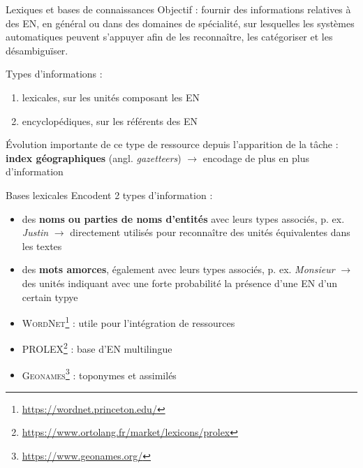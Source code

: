 \documentclass[xetex,xcolor={table,usenames,dvipsnames}]{beamer}
\newcommand{\bolder}[1]{{\color{purple}\bfseries#1}}
\begin{document}
\begin{frame}{Lexiques et bases de connaissances}
	Objectif : \textcolor{deepred}{fournir des informations relatives à des \textsc{EN}}, en général ou dans des domaines de spécialité, sur lesquelles les \textcolor{deepred}{systèmes automatiques peuvent s'appuyer} afin de les reconnaître, les catégoriser et les désambiguïser.
	
	Types d'informations : 
	\begin{enumerate}
		\item lexicales, sur les unités composant les \textsc{EN}
		\item encyclopédiques, sur les référents des \textsc{EN}
	\end{enumerate}
	
%	
		Évolution importante de ce type de ressource depuis l'apparition de la tâche :
	\bolder{index géographiques} (angl. \textit{gazetteers}) $\rightarrow$ encodage de plus en plus d'information
\end{frame}



\begin{frame}{Bases lexicales}
		Encodent 2 types d'information : 
	\begin{itemize}
		\item des \textcolor{deepblue}{\textbf{noms ou parties de noms d'entités}} avec leurs types associés, p. ex. \textit{Justin}
		$\rightarrow$ directement utilisés pour reconnaître des unités équivalentes dans les textes		
		\item des \textcolor{deepblue}{\textbf{mots amorces}}, également avec leurs types associés, p. ex. \textit{Monsieur}
		$\rightarrow$ des unités indiquant avec une forte probabilité la présence d'une \textsc{EN} d'un certain typye
	\end{itemize}
	\begin{itemize}
		\item \textsc{WordNet}\footnote{\url{https://wordnet.princeton.edu/}} : utile pour l'intégration de ressources
		\item \textsc{PROLEX}\footnote{\url{https://www.ortolang.fr/market/lexicons/prolex}} : base d'\textsc{EN} multilingue
		\item \textsc{Geonames}\footnote{\url{https://www.geonames.org/}} : toponymes et assimilés
	\end{itemize}
\end{frame}
\end{document}
